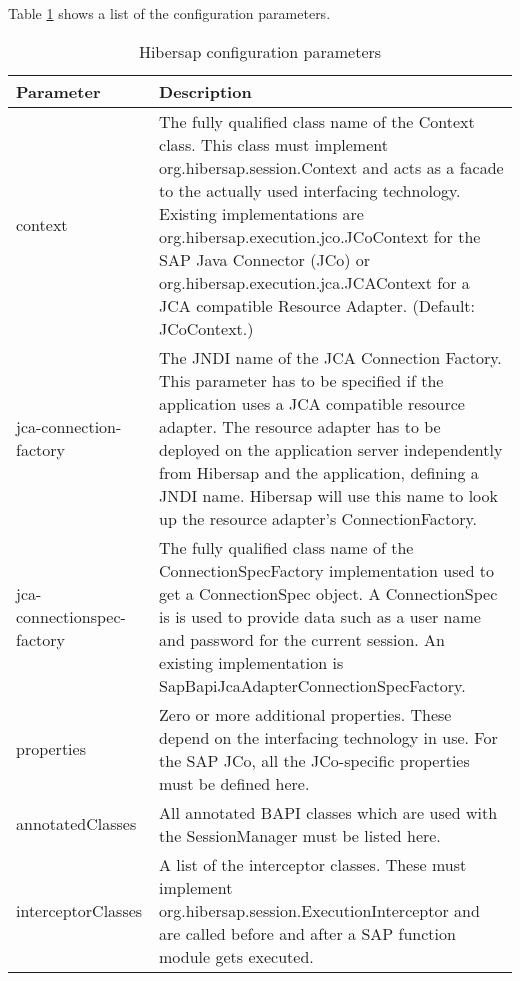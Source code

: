 Table \ref{tab:ConfigurationParameters} shows a list of the configuration parameters.

\begin{table}[H]
  \renewcommand{\arraystretch}{1.5}
  \centering
   \begin{tabularx}{\textwidth}{ l X }
    \toprule
    \textbf{Parameter}      & \textbf{Description} \\ 
    \midrule
    context                 &     
    The fully qualified class name of the Context class. This class must implement org.hibersap.session.Context and acts as a facade to
    the actually used interfacing technology. Existing 
    implementations are org.hibersap.execution.jco.JCoContext for the SAP Java Connector (JCo) or org.hibersap.execution.jca.JCAContext 
    for a JCA compatible Resource Adapter. (Default: JCoContext.) 
    \\
    jca-connection-factory  & 
    The JNDI name of the JCA Connection Factory. This parameter has to be specified if the application uses a JCA compatible resource 
    adapter. The resource adapter has to be deployed on the application server independently from Hibersap and the application, defining 
    a JNDI name. Hibersap will use this name to look up the resource adapter's ConnectionFactory. 
    \\
    jca-connectionspec-factory &
    The fully qualified class name of the ConnectionSpecFactory implementation used to get a ConnectionSpec object. A ConnectionSpec is
    is used to provide data such as a user name and password for the current session. An existing implementation is 
    SapBapiJcaAdapterConnectionSpecFactory.
    \\
    properties                   & 
    Zero or more additional properties. These depend on the interfacing technology in use. For the SAP JCo, all the JCo-specific 
    properties must be defined here. 
    \\
    annotatedClasses        & 
    All annotated BAPI classes which are used with the SessionManager must be listed here. 
    \\
    interceptorClasses       & 
    A list of the interceptor classes. These must implement org.hibersap.session.ExecutionInterceptor and are called before and after a 
    SAP function module gets executed. \\ 
    \bottomrule
  \end{tabularx}
  \caption{Hibersap configuration parameters}
  \label{tab:ConfigurationParameters}
\end{table}


